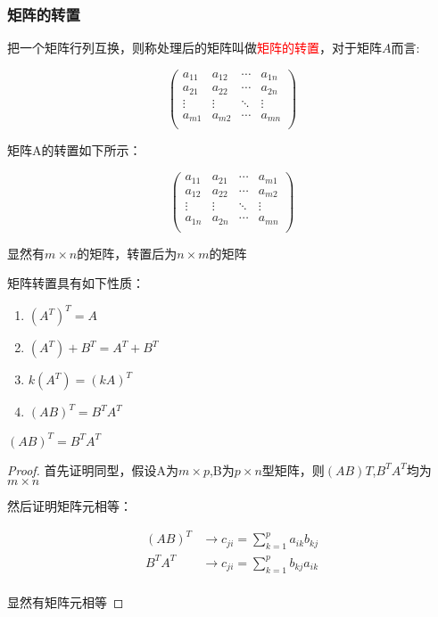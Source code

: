 \subsubsection{矩阵的转置}


把一个矩阵行列互换，则称处理后的矩阵叫做\textcolor{red}{矩阵的转置}，对于矩阵$A$而言:

$$
\begin{pmatrix}
	a_{11} &a_{12}&\cdots&a_{1n}\\
	a_{21}&a_{22}&\cdots&a_{2n}\\
	\vdots&\vdots&\ddots&\vdots\\
	a_{m1}&a_{m2}&\cdots&a_{mn}\\
\end{pmatrix}
$$

矩阵A的转置如下所示：

$$
\begin{pmatrix}
	a_{11} &a_{21}&\cdots&a_{m1}\\
	a_{12}&a_{22}&\cdots&a_{m2}\\
	\vdots&\vdots&\ddots&\vdots\\
	a_{1n}&a_{2n}&\cdots&a_{mn}\\
\end{pmatrix}
$$

显然有$m\times n$的矩阵，转置后为$n\times m$的矩阵

矩阵转置具有如下性质：

\begin{enumerate}
	\item  $(A^T)^T=A$
	\item $(A^T)+B^T=A^T+B^T$
	\item $k(A^T)=(kA)^T$
	\item $(AB)^T=B^TA^T$
\end{enumerate}

\begin{question}
	$(AB)^T=B^TA^T$
	
	\begin{proof}
		首先证明同型，假设A为$m\times p$,B为$p\times n$型矩阵，则$(AB)T$,$B^TA^T$均为$m\times n$

		然后证明矩阵元相等：

		$$
		\begin{aligned}
			(AB)^T&\rightarrow c_{ji}=\sum_{k=1}^p a_{ik}b_{kj}\\
			B^TA^T&\rightarrow c_{ji}=\sum_{k=1}^p b_{kj}a_{ik}\\
		\end{aligned}
		$$

		显然有矩阵元相等
	\end{proof}
\end{question}

